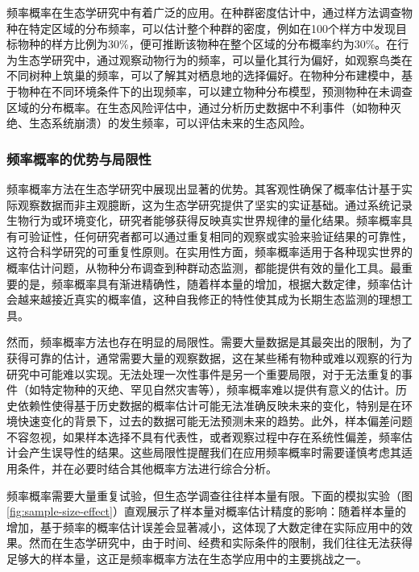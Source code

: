\documentclass[
  twoside,12pt,fontset=none]{ctexbook}
\begin{document}
频率概率在生态学研究中有着广泛的应用。在种群密度估计中，通过样方法调查物种在特定区域的分布频率，可以估计整个种群的密度，例如在100个样方中发现目标物种的样方比例为30\%，便可推断该物种在整个区域的分布概率约为30\%。在行为生态学研究中，通过观察动物行为的频率，可以量化其行为偏好，如观察鸟类在不同树种上筑巢的频率，可以了解其对栖息地的选择偏好。在物种分布建模中，基于物种在不同环境条件下的出现频率，可以建立物种分布模型，预测物种在未调查区域的分布概率。在生态风险评估中，通过分析历史数据中不利事件（如物种灭绝、生态系统崩溃）的发生频率，可以评估未来的生态风险。

\hypertarget{ux9891ux7387ux6982ux7387ux7684ux4f18ux52bfux4e0eux5c40ux9650ux6027}{%
\subsubsection{频率概率的优势与局限性}\label{ux9891ux7387ux6982ux7387ux7684ux4f18ux52bfux4e0eux5c40ux9650ux6027}}

频率概率方法在生态学研究中展现出显著的优势。其客观性确保了概率估计基于实际观察数据而非主观臆断，这为生态学研究提供了坚实的实证基础。通过系统记录生物行为或环境变化，研究者能够获得反映真实世界规律的量化结果。频率概率具有可验证性，任何研究者都可以通过重复相同的观察或实验来验证结果的可靠性，这符合科学研究的可重复性原则。在实用性方面，频率概率适用于各种现实世界的概率估计问题，从物种分布调查到种群动态监测，都能提供有效的量化工具。最重要的是，频率概率具有渐进精确性，随着样本量的增加，根据大数定律，频率估计会越来越接近真实的概率值，这种自我修正的特性使其成为长期生态监测的理想工具。

然而，频率概率方法也存在明显的局限性。需要大量数据是其最突出的限制，为了获得可靠的估计，通常需要大量的观察数据，这在某些稀有物种或难以观察的行为研究中可能难以实现。无法处理一次性事件是另一个重要局限，对于无法重复的事件（如特定物种的灭绝、罕见自然灾害等），频率概率难以提供有意义的估计。历史依赖性使得基于历史数据的概率估计可能无法准确反映未来的变化，特别是在环境快速变化的背景下，过去的数据可能无法预测未来的趋势。此外，样本偏差问题不容忽视，如果样本选择不具有代表性，或者观察过程中存在系统性偏差，频率估计会产生误导性的结果。这些局限性提醒我们在应用频率概率时需要谨慎考虑其适用条件，并在必要时结合其他概率方法进行综合分析。

频率概率需要大量重复试验，但生态学调查往往样本量有限。下面的模拟实验（图\ref{fig:sample-size-effect}）直观展示了样本量对概率估计精度的影响：随着样本量的增加，基于频率的概率估计误差会显著减小，这体现了大数定律在实际应用中的效果。然而在生态学研究中，由于时间、经费和实际条件的限制，我们往往无法获得足够大的样本量，这正是频率概率方法在生态学应用中的主要挑战之一。
\end{document}
